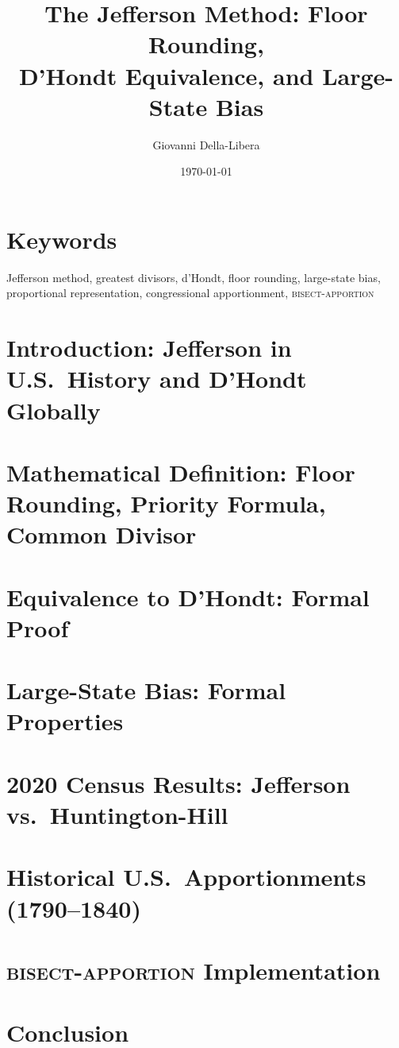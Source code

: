 \documentclass[12pt]{article}
\title{\textbf{The Jefferson Method: Floor Rounding,\\
D'Hondt Equivalence, and Large-State Bias}}
\author{Giovanni Della-Libera}
\date{\today}
\begin{document}
\maketitle

\begin{abstract}

\end{abstract}

\section*{Keywords}
Jefferson method, greatest divisors, d'Hondt, floor rounding,
large-state bias, proportional representation, congressional apportionment,
\textsc{bisect-apportion}

\section{Introduction: Jefferson in U.S.\ History and D'Hondt Globally}


\section{Mathematical Definition: Floor Rounding, Priority Formula, Common Divisor}


\section{Equivalence to D'Hondt: Formal Proof}


\section{Large-State Bias: Formal Properties}


\section{2020 Census Results: Jefferson vs.\ Huntington-Hill}


\section{Historical U.S.\ Apportionments (1790--1840)}


\section{\textsc{bisect-apportion} Implementation}


\section{Conclusion}




\end{document}
